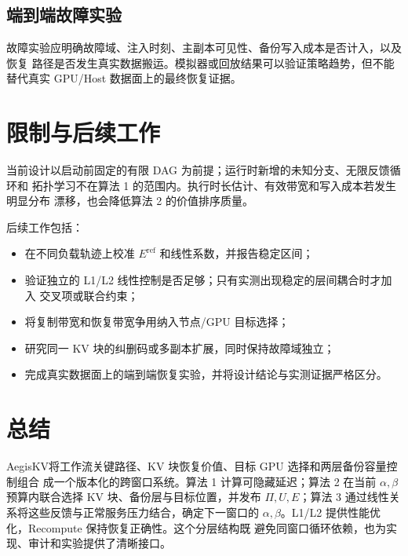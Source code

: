 \documentclass[UTF8,11pt,a4paper,fontset=fandol]{ctexart}
\newcommand{\AegisKV}{AegisKV}
\begin{document}
\subsection{端到端故障实验}

故障实验应明确故障域、注入时刻、主副本可见性、备份写入成本是否计入，以及恢复
路径是否发生真实数据搬运。模拟器或回放结果可以验证策略趋势，但不能替代真实
GPU/Host 数据面上的最终恢复证据。

\section{限制与后续工作}

当前设计以启动前固定的有限 DAG 为前提；运行时新增的未知分支、无限反馈循环和
拓扑学习不在算法 1 的范围内。执行时长估计、有效带宽和写入成本若发生明显分布
漂移，也会降低算法 2 的价值排序质量。

后续工作包括：

\begin{itemize}
  \item 在不同负载轨迹上校准 $E^{\mathrm{ref}}$ 和线性系数，并报告稳定区间；
  \item 验证独立的 L1/L2 线性控制是否足够；只有实测出现稳定的层间耦合时才加入
    交叉项或联合约束；
  \item 将复制带宽和恢复带宽争用纳入节点/GPU 目标选择；
  \item 研究同一 KV 块的纠删码或多副本扩展，同时保持故障域独立；
  \item 完成真实数据面上的端到端恢复实验，并将设计结论与实测证据严格区分。
\end{itemize}

\section{总结}

\AegisKV 将工作流关键路径、KV 块恢复价值、目标 GPU 选择和两层备份容量控制组合
成一个版本化的跨窗口系统。算法 1 计算可隐藏延迟；算法 2 在当前
$\alpha,\beta$ 预算内联合选择 KV 块、备份层与目标位置，并发布
$\Pi,U,E$；算法 3 通过线性关系将这些反馈与正常服务压力结合，确定下一窗口的
$\alpha,\beta$。L1/L2 提供性能优化，Recompute 保持恢复正确性。这个分层结构既
避免同窗口循环依赖，也为实现、审计和实验提供了清晰接口。
\end{document}
